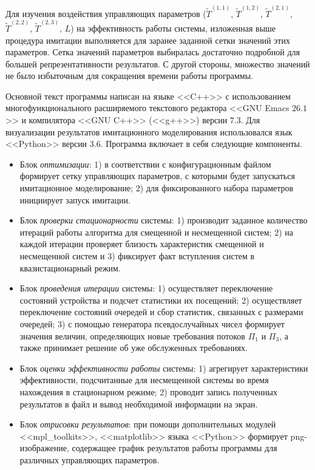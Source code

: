 Для изучения воздействия управляющих параметров ($\widetilde T^{(1,1)}$, $\widetilde T^{(1,2)}$, $\widetilde T^{(2,1)}$, $\widetilde T^{(2,2)}$, $\widetilde T^{(2,3)}$, $L$) на эффективность работы системы, изложенная выше процедура имитации выполняется для заранее заданной сетки значений этих параметров. Сетка значений параметров выбиралась достаточно подробной для большей репрезентативности результатов. С другой стороны, множество значений не было избыточным для сокращения времени работы программы. 

Основной текст программы написан на языке <<C++>> с использованием многофункционального расширяемого текстового редактора <<GNU Emacs $26.1$>> и компилятора <<GNU C++>> (<<g++>>) версии $7.3$. Для визуализации результатов имитационного моделирования использовался язык <<Python>> версии $3.6$. Программа включает в себя следующие компоненты.
\begin{itemize}
    \item Блок \textit{оптимизации}: 1) в соответствии с конфигурационным файлом формирует сетку управляющих параметров, с которыми будет запускаться имитационное моделирование; 2) для фиксированного набора параметров инициирует запуск имитации.
    \item Блок \textit{проверки стационарности} системы: 1) производит заданное количество итераций работы алгоритма для смещенной и несмещенной систем; 2) на каждой итерации проверяет близость характеристик смещенной и несмещенной систем и 3) фиксирует факт вступления систем в квазистационарный режим.
    \item Блок \textit{проведения итерации} системы: 1) осуществляет переключение состояний устройства и подсчет статистики их посещений; 2) осуществляет переключение состояний очередей и сбор статистик, связанных с размерами очередей; 3) с помощью генератора псевдослучайных чисел формирует значения величин, определяющих новые требования потоков $\Pi_1$ и $\Pi_3$, а также принимает решение об уже обслуженных требованиях.
    \item Блок \textit{оценки эффективности работы} системы: 1) агрегирует характеристики эффективности, подсчитанные для несмещенной системы во время нахождения в стационарном режиме; 2) проводит запись полученных результатов в файл и вывод необходимой информации на экран.
    \item Блок \textit{отрисовки результатов}: при помощи дополнительных модулей <<mpl\_toolkits>>, <<matplotlib>> языка <<Python>> формирует png-изображение, содержащее график результатов работы программы для различных управляющих параметров.
\end{itemize}


